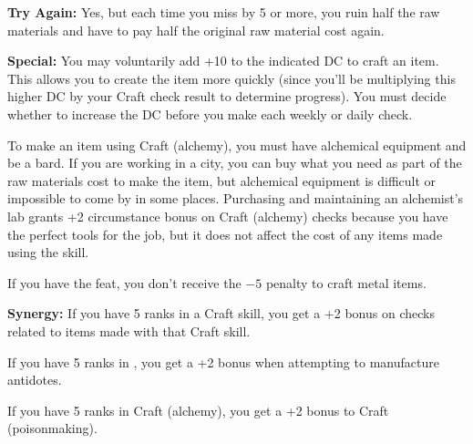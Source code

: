 \textbf{Try Again:} Yes, but each time you miss by 5 or more, you ruin half the raw materials and have to pay half the original raw material cost again.

\textbf{Special:} You may voluntarily add +10 to the indicated DC to craft an item. This allows you to create the item more quickly (since you'll be multiplying this higher DC by your Craft check result to determine progress). You must decide whether to increase the DC before you make each weekly or daily check.

To make an item using Craft (alchemy), you must have alchemical equipment and be a bard. If you are working in a city, you can buy what you need as part of the raw materials cost to make the item, but alchemical equipment is difficult or impossible to come by in some places. Purchasing and maintaining an alchemist's lab grants +2 circumstance bonus on Craft (alchemy) checks because you have the perfect tools for the job, but it does not affect the cost of any items made using the skill.

If you have the  feat, you don't receive the $-5$ penalty to craft metal items.

\textbf{Synergy:} If you have 5 ranks in a Craft skill, you get a +2 bonus on  checks related to items made with that Craft skill.

If you have 5 ranks in , you get a +2 bonus when attempting to manufacture antidotes.

If you have 5 ranks in Craft (alchemy), you get a +2 bonus to Craft (poisonmaking).
